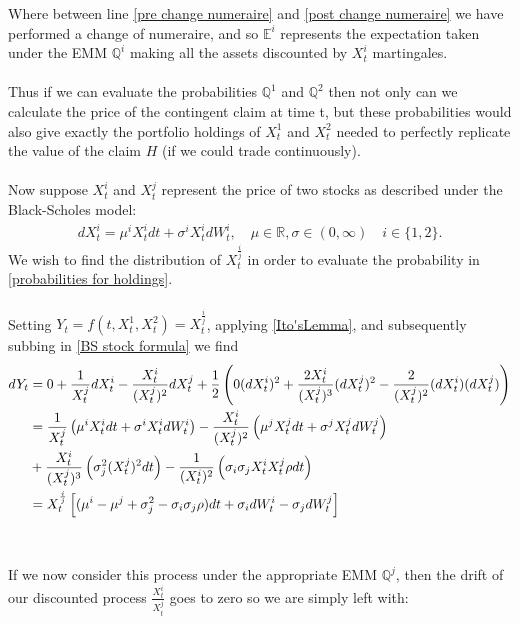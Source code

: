 \documentclass{article}
\theoremstyle{definition}
\begin{document}
Where between line \ref{pre change numeraire} and \ref{post change numeraire} we have performed a change of numeraire, and so $\mathbb{E}^i$ represents the expectation taken under the EMM $\mathbb{Q}^i$ making all the assets discounted by $X_t^i$ martingales.\\\\
Thus if we can evaluate the probabilities $\mathbb{Q}^{1}$ and $\mathbb{Q}^{2}$ then not only can we calculate the price of the contingent claim at time t, but these probabilities would also give exactly the portfolio holdings of $X_{t}^{1}$ and $X_{t}^{2}$ needed to perfectly replicate the value of the claim $H$ (if we could trade continuously).\\\\
Now suppose $X_{t}^{i}$ and $X_{t}^{j}$ represent the price of two stocks as described under the Black-Scholes model:
\begin{align}
\label{BS stock formula}
    dX_t^{i} = \mu^{i} X_t^{i} dt + \sigma^{i} X_t^{i} dW_t^{i}, \quad \mu \in \mathbb{R}, \sigma \in (0, \infty) \quad i \in \{1,2\}.
\end{align}
We wish to find the distribution of $X_{t}^{\frac{i}{j}}$ in order to evaluate the probability in \ref{probabilities for holdings}.\\\\
Setting $Y_{t} = f\left(t, X_{t}^{1}, X_{t}^{2}\right) = X_{t}^{\frac{i}{j}}$, applying \ref{Ito'sLemma}, and subsequently subbing in \ref{BS stock formula}  we find
\begin{align}
dY_t &= 0 + \frac{1}{X_t^j} dX_t^i - \frac{X_t^i}{(X_t^j)^2}dX_t^j + \frac{1}{2}\left(0 (dX_t^i)^2 + \frac{2X_t^i}{(X_t^j)^3} (dX_t^j)^2 -\frac{2}{(X_t^j)^2} (dX_t^i)(dX_t^j)\right)\\
&= \frac{1}{X_t^j}\left(\mu^{i} X_t^{i} dt + \sigma^{i} X_t^{i} dW_t^{i}\right) - \frac{X_t^i}{(X_t^j)^2}\left(\mu^{j} X_t^{j} dt + \sigma^{j} X_t^{j} dW_t^{j}\right) \notag \\
&+ \frac{X_t^i}{(X_t^j)^3}\left(\sigma_j^2(X_t^j)^2dt \right) - \frac{1}{(X_t^i)^2}\left(\sigma_i\sigma_jX_t^iX_t^j\rho dt\right)\\
&=X_t^{\frac{i}{j}}\left[(\mu^i -\mu^j +\sigma_j^2 - \sigma_i\sigma_j \rho) dt + \sigma_i dW_t^i - \sigma_j dW_t^j\right]
\end{align}
\\\\
If we now consider this process under the appropriate EMM $\mathbb{Q}^j$, then the drift of our discounted process $\frac{X_t^i}{X_t^j}$ goes to zero so we are simply left with:
\end{document}
